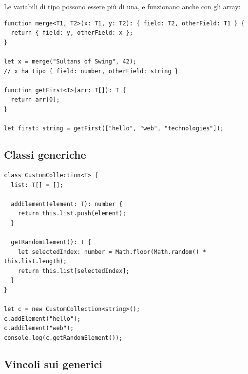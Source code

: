 Le variabili di tipo possono essere più di una, e funzionano anche con gli
array:

\begin{lstlisting}[style=ts]
function merge<T1, T2>(x: T1, y: T2): { field: T2, otherField: T1 } {
  return { field: y, otherField: x };
}

let x = merge("Sultans of Swing", 42);
// x ha tipo { field: number, otherField: string }

function getFirst<T>(arr: T[]): T {
  return arr[0];
}

let first: string = getFirst(["hello", "web", "technologies"]);
\end{lstlisting}

\subsection{Classi generiche}

\begin{lstlisting}[style=ts, name=generic_class.ts]
class CustomCollection<T> {
  list: T[] = [];

  addElement(element: T): number {
    return this.list.push(element);
  }

  getRandomElement(): T {
    let selectedIndex: number = Math.floor(Math.random() * this.list.length);
    return this.list[selectedIndex];
  }
}

let c = new CustomCollection<string>();
c.addElement("hello");
c.addElement("web");
console.log(c.getRandomElement());
\end{lstlisting}

\subsection{Vincoli sui generici}

